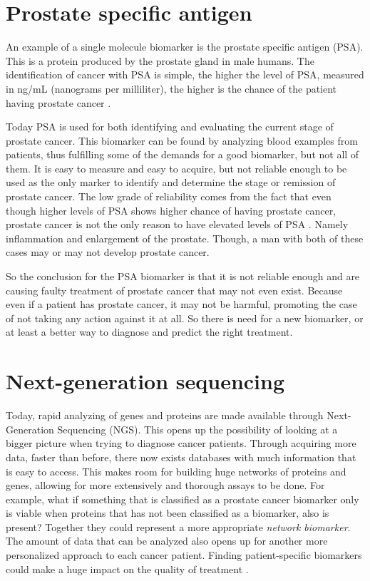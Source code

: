 \documentclass[UKenglish,11pt,a4paper]{article}
\begin{document}
\section{Prostate specific antigen}
An example of a single molecule biomarker is the prostate specific antigen (PSA). This is a protein produced by the 
prostate gland in male humans. The identification of cancer with PSA is simple, the higher the level of PSA, measured in
ng/mL (nanograms per milliliter), the higher is the chance of the patient having prostate cancer \cite{cancerfacts}.

Today PSA is used for both identifying and evaluating the current stage of prostate cancer. This biomarker can be found 
by analyzing blood examples from patients, thus fulfilling some of the demands for a good biomarker,
but not all of them. It is easy to measure and easy to acquire, but not reliable enough to be used as the only marker
to identify and determine the stage or remission of prostate cancer. The low grade of reliability comes from the fact
that even though higher levels of PSA shows higher chance of having prostate cancer, prostate cancer is not the only
reason to have elevated levels of PSA \cite{cancerfacts}. Namely inflammation and enlargement of the prostate. Though, a
man with both of these cases may or may not develop prostate cancer.

So the conclusion for the PSA biomarker is that it is not reliable enough and are causing faulty treatment of prostate
cancer that may not even exist. Because even if a patient has prostate cancer, it may not be harmful, promoting the case
of not taking any action against it at all. So there is need for a new biomarker, or at least a better way to diagnose
and predict the right treatment.

\section{Next-generation sequencing}
Today, rapid analyzing of genes and proteins are made available through Next-Generation Sequencing (NGS)\cite{ngs1}.
This opens up the possibility of looking at a bigger picture when trying to diagnose cancer patients. Through acquiring
more data, faster than before, there now exists databases with much information that is easy to access. This makes room
for building huge networks of proteins and genes, allowing for more extensively and thorough assays to be done. For
example, what if something that is classified as a prostate cancer biomarker only is viable when proteins that has not
been classified as a biomarker, also is present? Together they could represent a more appropriate
\emph{network biomarker}.
The amount of data that can be analyzed also opens up for another more personalized approach to each cancer patient.
Finding patient-specific biomarkers could make a huge impact on the quality of treatment \cite{personalized}.
\end{document}
